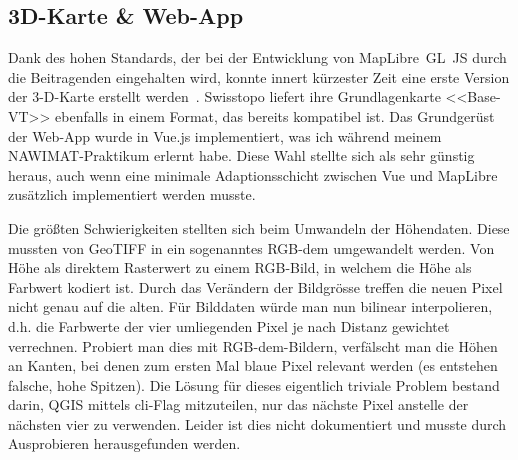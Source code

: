 \subsection{3D-Karte \& Web-App}

Dank des hohen Standards, der bei der Entwicklung von MapLibre~GL~JS durch die Beitragenden eingehalten wird, konnte innert kürzester Zeit eine erste Version der 3-D-Karte erstellt werden~\cite{maplibregljs}. Swisstopo liefert ihre Grundlagenkarte <<Base-VT>> ebenfalls in einem Format, das bereits kompatibel ist. Das Grundgerüst der Web-App wurde in Vue.js implementiert, was ich während meinem NAWIMAT-Praktikum erlernt habe. Diese Wahl stellte sich als sehr günstig heraus, auch wenn eine minimale Adaptionsschicht zwischen Vue und MapLibre zusätzlich implementiert werden musste.

Die größten Schwierigkeiten stellten sich beim Umwandeln der Höhendaten. Diese mussten von GeoTIFF in ein sogenanntes RGB-\acrshort{dem} umgewandelt werden. Von Höhe als direktem Rasterwert zu einem RGB-Bild, in welchem die Höhe als Farbwert kodiert ist. Durch das Verändern der Bildgrösse treffen die neuen Pixel nicht genau auf die alten. Für Bilddaten würde man nun bilinear interpolieren, d.h. die Farbwerte der vier umliegenden Pixel je nach Distanz gewichtet verrechnen. Probiert man dies mit RGB-\acrshort{dem}-Bildern, verfälscht man die Höhen an Kanten, bei denen zum ersten Mal blaue Pixel relevant werden (es entstehen falsche, hohe Spitzen). Die Lösung für dieses eigentlich triviale Problem bestand darin, QGIS mittels \acrshort{cli}-Flag mitzuteilen, nur das nächste Pixel anstelle der nächsten vier zu verwenden. Leider ist dies nicht dokumentiert und musste durch Ausprobieren herausgefunden werden.

